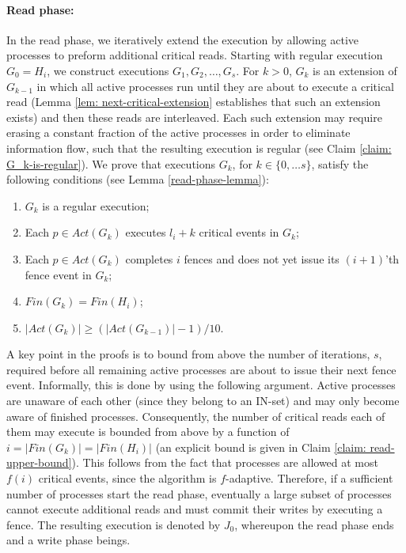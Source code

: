 \paragraph{Read phase:}
In the read phase, we iteratively extend the execution by allowing active processes to preform additional critical reads. Starting with regular execution $G_0=H_i$, we construct executions $G_1,G_2,\ldots,G_s$. For $k>0$, $G_k$ is an extension of $G_{k-1}$ in which all active processes run until they are about to execute a critical read (Lemma \ref{lem: next-critical-extension} establishes that such an extension exists) and then these reads are interleaved. Each such extension may require erasing a constant fraction of the active processes in order to eliminate information flow, such that the resulting execution is regular (see Claim \ref{claim: G_k-is-regular}). We prove that executions $G_k$, for $k \in \{0, \ldots s\}$, satisfy the following conditions (see Lemma \ref{read-phase-lemma}):
 \begin{enumerate}[(1)]
 	\item $G_k$ is a regular execution;
 	\item Each $p \in Act(G_k)$ executes $l_i+k$ critical events in $G_k$;
 	\item Each $p \in Act(G_k)$ completes $i$ fences and does not yet issue its $(i+1)$'th fence event in $G_k$;
 	\item $Fin(G_k) = Fin(H_i)$;
 	\item $|Act(G_k)| \geq (|Act(G_{k-1})|-1)/10$.
 \end{enumerate}


A key point in the proofs is to bound from above the number of iterations, $s$, required before all remaining active processes are about to issue their next fence event. Informally, this is done by using the following argument. Active processes are unaware of each other (since they belong to an IN-set) and may only become aware of finished processes. Consequently, the number of critical reads each of them may execute is bounded from above by a function of $i=\vert {Fin}(G_k) \vert = \vert {Fin}(H_i) \vert$ (an explicit bound is given in Claim \ref{claim: read-upper-bound}). This follows from the fact that processes are allowed at most $f(i)$ critical events, since the algorithm is $f$-adaptive. Therefore, if a sufficient number of processes start the read phase, eventually a large subset of processes cannot execute additional reads and must commit their writes by executing a fence. The resulting execution is denoted by $J_0$, whereupon the read phase ends and a write phase beings.

